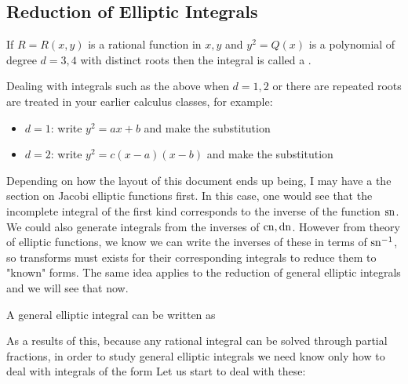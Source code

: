 \documentclass{article}
\begin{document}
\subsection{Reduction of Elliptic Integrals}

\begin{definition}
	If $R=R(x,y)$ is a rational function in $x,y$ and $y^2=Q(x)$ is a polynomial of degree $d=3,4$ with distinct roots then the integral
is called a . 
\end{definition}

\begin{remark}
	Dealing with integrals such as the above when $d=1,2$ or there are repeated roots are treated in your earlier calculus classes, for example:
	\begin{itemize}
		\item $d=1$: write $y^2 = ax+b$ and make the substitution 
		\item $d=2$: write $y^2 = c(x-a)(x-b)$ and make the substitution 
	\end{itemize}
\end{remark}

\begin{remark}
	Depending on how the layout of this document ends up being, I may have a the section on Jacobi elliptic functions first. In this case, one would see that the incomplete integral of the first kind corresponds to the inverse of the function $\operatorname{sn}$. We could also generate integrals from the inverses of $\operatorname{cn}, \operatorname{dn}$. However from theory of elliptic functions, we know we can write the inverses of these in terms of $\operatorname{sn}^{-1}$, so transforms must exists for their corresponding integrals to reduce them to "known" forms. The same idea applies to the reduction of general elliptic integrals and we will see that now. 
\end{remark}

\begin{prop}
A general elliptic integral can be written as 
\end{prop}
As a results of this, because any rational integral can be solved through partial fractions, in order to study general elliptic integrals we need know only how to deal with integrals of the form 
Let us start to deal with these:
\end{document}

